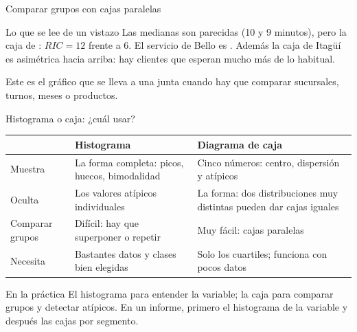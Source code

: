 \documentclass[aspectratio=169,10pt]{beamer}
\newcommand{\cajahor}[8]{%
  \draw[#8,thick] (#2*#1,#7) -- (#3*#1,#7);
  \draw[#8,thick] (#5*#1,#7) -- (#6*#1,#7);
  \draw[#8,thick] (#2*#1,#7-0.16) -- (#2*#1,#7+0.16);
  \draw[#8,thick] (#6*#1,#7-0.16) -- (#6*#1,#7+0.16);
  \draw[#8,thick,fill=#8!18] (#3*#1,#7-0.28) rectangle (#5*#1,#7+0.28);
  \draw[#8,very thick] (#4*#1,#7-0.28) -- (#4*#1,#7+0.28);
}
\begin{document}
\begin{frame}{Comparar grupos con cajas paralelas}
  \centering

  \vspace{0.35cm}
  \begin{alertblock}{Lo que se lee de un vistazo}
    \scriptsize
    Las medianas son parecidas (10 y 9 minutos), pero la caja de
    : $RIC = 12$ frente a 6. El servicio
    de Bello es . Además la caja de Itagüí es asimétrica
    hacia arriba: hay clientes que esperan mucho más de lo habitual.
  \end{alertblock}

  \vspace{0.05cm}
  {\tiny\color{uniGris} Este es el gráfico que se lleva a una junta cuando hay
  que comparar sucursales, turnos, meses o productos.}
\end{frame}

\begin{frame}{Histograma o caja: ¿cuál usar?}
  \scriptsize
  \begin{center}
  \begin{tabular}{@{}p{2.4cm}p{4.6cm}p{4.6cm}@{}}
    \toprule
    & \textbf{Histograma} & \textbf{Diagrama de caja} \\
    \midrule
    Muestra & La forma completa: picos, huecos, bimodalidad &
      Cinco números: centro, dispersión y atípicos \\
    \addlinespace
    Oculta & Los valores atípicos individuales &
      La forma: dos distribuciones muy distintas pueden dar cajas iguales \\
    \addlinespace
    Comparar grupos & Difícil: hay que superponer o repetir &
      Muy fácil: cajas paralelas \\
    \addlinespace
    Necesita & Bastantes datos y clases bien elegidas &
      Solo los cuartiles; funciona con pocos datos \\
    \bottomrule
  \end{tabular}
  \end{center}

  \vspace{0.1cm}
  \begin{alertblock}{En la práctica}
    \scriptsize
     El histograma para entender la variable; la
    caja para comparar grupos y detectar atípicos. En un informe, primero el
    histograma de la variable y después las cajas por segmento.
  \end{alertblock}
\end{frame}
\end{document}
